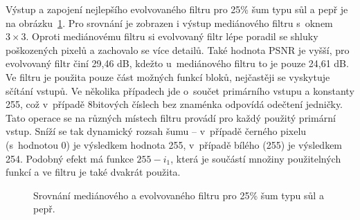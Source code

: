 Výstup a zapojení nejlepšího evolvovaného filtru pro 25\% šum typu sůl a pepř je na obrázku~\ref{obrFilterSP}. Pro srovnání je zobrazen i výstup mediánového filtru s~oknem $3\times3$. Oproti mediánovému filtru si evolvovaný filtr lépe poradil se shluky poškozených pixelů a zachovalo se více detailů. Také hodnota PSNR je vyšší, pro evolvovaný filtr činí 29,46 dB, kdežto u~mediánového filtru to je pouze 24,61 dB. Ve filtru je použita pouze část možných funkcí bloků, nejčastěji se vyskytuje sčítání vstupů. Ve několika případech jde o~součet primárního vstupu a konstanty 255, což v~případě 8bitových číslech bez znaménka odpovídá odečtení jedničky. Tato operace se na různých místech filtru provádí pro každý použitý primární vstup. Sníží se tak dynamický rozsah šumu -- v~případě černého pixelu (s~hodnotou 0) je výsledkem hodnota 255, v~případě bílého (255) je výsledkem 254. Podobný efekt má funkce $255 - i_1$, která je součástí množiny použitelných funkcí a ve filtru je také dvakrát použita.

\begin{figure}[hbt]
    \centering
    \hfill
    \hfill
    \caption{Srovnání mediánového a evolvovaného filtru pro 25\% šum typu sůl a pepř.}
    \label{obrFilterSP}
\end{figure}

